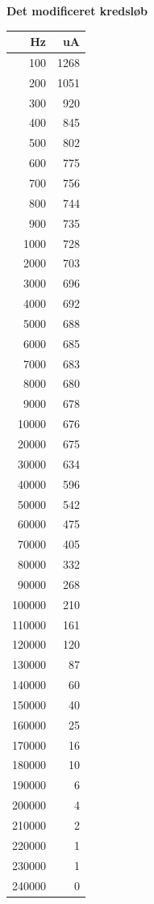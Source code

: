 \documentclass[main.tex]{subfiles}
\begin{document}
\textbf{Det modificeret kredsløb}\\

\begin{table}[H]
\begin{minipage}[b]{0.30\linewidth}
\centering
\begin{tabular}{ r |  r }
    \hline
    Hz & uA \\ \hline
    100 & 1268 \\ \hline
    200 & 1051 \\ \hline
    300 & 920 \\ \hline
    400 & 845 \\ \hline
    500 & 802 \\ \hline
    600 & 775 \\ \hline
    700 & 756 \\ \hline
    800 & 744 \\ \hline
    900 & 735 \\ \hline
    1000 & 728 \\ \hline
    2000 & 703 \\ \hline
    3000 & 696 \\ \hline
    4000 & 692 \\ \hline
    5000 & 688 \\ \hline
    6000 & 685 \\ \hline
    7000 & 683 \\ \hline
    8000 & 680 \\ \hline
    9000 & 678 \\ \hline
    10000 & 676 \\ \hline
    20000 & 675 \\ \hline
    30000 & 634 \\ \hline
    40000 & 596 \\ \hline
    50000 & 542 \\ \hline
    60000 & 475 \\ \hline
    70000 & 405 \\ \hline
    80000 & 332 \\ \hline
    90000 & 268 \\ \hline
    100000 & 210 \\ \hline
    110000 & 161 \\ \hline
    120000 & 120 \\ \hline
    130000 & 87 \\ \hline
    140000 & 60 \\ \hline
    150000 & 40 \\ \hline
    160000 & 25 \\ \hline
    170000 & 16 \\ \hline
    180000 & 10 \\ \hline
    190000 & 6 \\ \hline
    200000 & 4 \\ \hline
    210000 & 2 \\ \hline
    220000 & 1 \\ \hline
    230000 & 1 \\ \hline
    240000 & 0 \\ \hline
        

\end{tabular}
\end{minipage}
\end{table}
\end{document}
